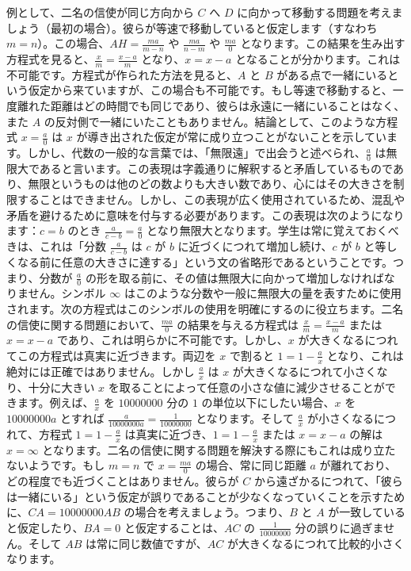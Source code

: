 \documentclass[a4paper,11pt,openany]{ltjsbook}
\begin{document}
例として、二名の信使が同じ方向から $C$ へ $D$ に向かって移動する問題を考えましょう（最初の場合）。彼らが等速で移動していると仮定します（すなわち $m = n$）。この場合、$AH = \frac{ma}{m - n}$ や $\frac{ma}{n - m}$ や $\frac{ma}{0}$ となります。この結果を生み出す方程式を見ると、$\frac{x}{m} = \frac{x - a}{m}$ となり、$x = x - a$ となることが分かります。これは不可能です。方程式が作られた方法を見ると、$A$ と $B$ がある点で一緒にいるという仮定から来ていますが、この場合も不可能です。もし等速で移動すると、一度離れた距離はどの時間でも同じであり、彼らは永遠に一緒にいることはなく、また $A$ の反対側で一緒にいたこともありません。結論として、このような方程式 $x = \frac{a}{0}$ は $x$ が導き出された仮定が常に成り立つことがないことを示しています。しかし、代数の一般的な言葉では、「無限遠」で出会うと述べられ、$\frac{a}{0}$ は無限大であると言います。この表現は字義通りに解釈すると矛盾しているものであり、無限というものは他のどの数よりも大きい数であり、心にはその大きさを制限することはできません。しかし、この表現が広く使用されているため、混乱や矛盾を避けるために意味を付与する必要があります。この表現は次のようになります：$c = b$ のとき $\frac{a}{c - b} = \frac{a}{0}$ となり無限大となります。学生は常に覚えておくべきは、これは「分数 $\frac{a}{c - b}$ は $c$ が $b$ に近づくにつれて増加し続け、$c$ が $b$ と等しくなる前に任意の大きさに達する」という文の省略形であるということです。つまり、分数が $\frac{a}{0}$ の形を取る前に、その値は無限大に向かって増加しなければなりません。シンボル $\infty$ はこのような分数や一般に無限大の量を表すために使用されます。次の方程式はこのシンボルの使用を明確にするのに役立ちます。二名の信使に関する問題において、$\frac{ma}{0}$ の結果を与える方程式は $\frac{x}{m} = \frac{x - a}{m}$ または $x = x - a$ であり、これは明らかに不可能です。しかし、$x$ が大きくなるにつれてこの方程式は真実に近づきます。両辺を $x$ で割ると $1 = 1 - \frac{a}{x}$ となり、これは絶対には正確ではありません。しかし $\frac{a}{x}$ は $x$ が大きくなるにつれて小さくなり、十分に大きい $x$ を取ることによって任意の小さな値に減少させることができます。例えば、$\frac{a}{x}$ を $10000000$ 分の $1$ の単位以下にしたい場合、$x$ を $10000000a$ とすれば $\frac{a}{10000000a} = \frac{1}{10000000}$ となります。そして $\frac{a}{x}$ が小さくなるにつれて、方程式 $1 = 1 - \frac{a}{x}$ は真実に近づき、$1 = 1 - \frac{a}{x}$ または $x = x - a$ の解は $x = \infty$ となります。二名の信使に関する問題を解決する際にもこれは成り立たないようです。もし $m = n$ で $x = \frac{ma}{0}$ の場合、常に同じ距離 $a$ が離れており、どの程度でも近づくことはありません。彼らが $C$ から遠ざかるにつれて、「彼らは一緒にいる」という仮定が誤りであることが少なくなっていくことを示すために、$CA = 10000000 AB$ の場合を考えましょう。つまり、$B$ と $A$ が一致していると仮定したり、$BA = 0$ と仮定することは、$AC$ の $\frac{1}{10000000}$ 分の誤りに過ぎません。そして $AB$ は常に同じ数値ですが、$AC$ が大きくなるにつれて比較的小さくなります。
\end{document}
